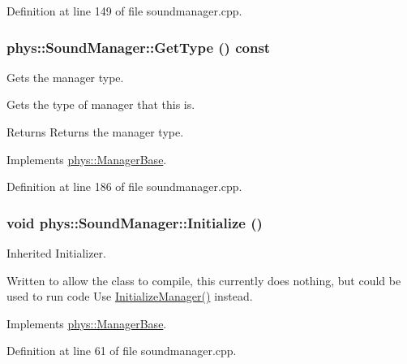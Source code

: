 Definition at line 149 of file soundmanager.cpp.

\hypertarget{classphys_1_1SoundManager_a6815f78a6170b119e2d1d24e862ffbf8}{
\subsubsection[{GetType}]{ phys::SoundManager::GetType () const}}
\label{d1/dc4/classphys_1_1SoundManager_a6815f78a6170b119e2d1d24e862ffbf8}


Gets the manager type. 

Gets the type of manager that this is. \begin{DoxyReturn}{Returns}
Returns the manager type. 
\end{DoxyReturn}


Implements \hyperlink{classphys_1_1ManagerBase_aff400b6599db635e24796d8221e9a0e3}{phys::ManagerBase}.



Definition at line 186 of file soundmanager.cpp.

\hypertarget{classphys_1_1SoundManager_ae6d3957f965b54e06ec540e903cec68d}{
\subsubsection[{Initialize}]{\setlength{\rightskip}{0pt plus 5cm}void phys::SoundManager::Initialize ()}}
\label{d1/dc4/classphys_1_1SoundManager_ae6d3957f965b54e06ec540e903cec68d}


Inherited Initializer. 

Written to allow the class to compile, this currently does nothing, but could be used to run code Use \hyperlink{classphys_1_1SoundManager_aa0fc07170611851f3fa888c8e28d99df}{InitializeManager()} instead. 

Implements \hyperlink{classphys_1_1ManagerBase_a57dd8e54e767427d5bdcc86dc66d73ed}{phys::ManagerBase}.



Definition at line 61 of file soundmanager.cpp.

